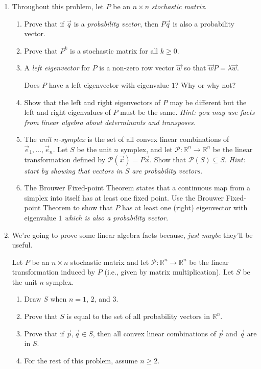 \documentclass[letter]{article}
\newcommand{\R}{\mathbb{R}}
\begin{document}
\begin{enumerate}
		\item Throughout this problem, let $P$ be an $n\times n$ \emph{stochastic matrix}. 
		\begin{enumerate}
			\item Prove that if $\vec q$ is a \emph{probability vector}, then $P\vec q$ is also
				a probability vector.
			\item Prove that $P^k$ is a stochastic matrix for all $k\geq 0$.

			\item A \emph{left eigenvector} for $P$ is a non-zero row vector $\vec w$ so
				that $\vec wP=\lambda \vec w$.

				Does $P$ have a left eigenvector with eigenvalue $1$? Why or why not?
			\item Show that the left and right eigenvectors of $P$ may be different but the left
				and right eigenvalues of $P$ must be the same. \emph{Hint: you may use
				facts from linear algebra about determinants and transposes.}

			\item The \emph{unit $n$-symplex} is the set of all convex linear combinations
				of $\vec e_1,\ldots,\vec e_n$. Let $S$ be the unit $n$ symplex, and let $\mathcal P:\R^n\to\R^n$
				be the linear transformation defined by $\mathcal P(\vec x)=P\vec x$. Show that $\mathcal P(S)\subseteq S$.
				\emph{Hint: start by showing that vectors in $S$ are probability vectors.}

			\item The Brouwer Fixed-point Theorem states that a continuous map from a simplex into itself
				has at least one fixed point. Use the Brouwer Fixed-point Theorem to show that $P$ has
				at least one (right) eigenvector with eigenvalue $1$ \emph{which is also a probability vector}.
		\end{enumerate}

		\item We're going to prove some linear algebra facts because, \emph{just maybe} they'll be useful.
		
			Let $P$ be an $n\times n$ stochastic matrix and let $\mathcal P:\R^n\to\R^n$ be the linear
			transformation induced by $P$ (i.e., given by matrix multiplication). Let $S$ be the unit $n$-symplex.
		\begin{enumerate}
			\item Draw $S$ when $n=1$, $2$, and $3$.
			\item Prove that $S$ is equal to the set of all probability vectors in $\R^n$.
			\item Prove that if $\vec p,\vec q\in S$, then all convex linear combinations of $\vec p$
				and $\vec q$ are in $S$.
			\item For the rest of this problem, assume $n\geq 2$.


\end{enumerate}
\end{enumerate}
\end{document}
